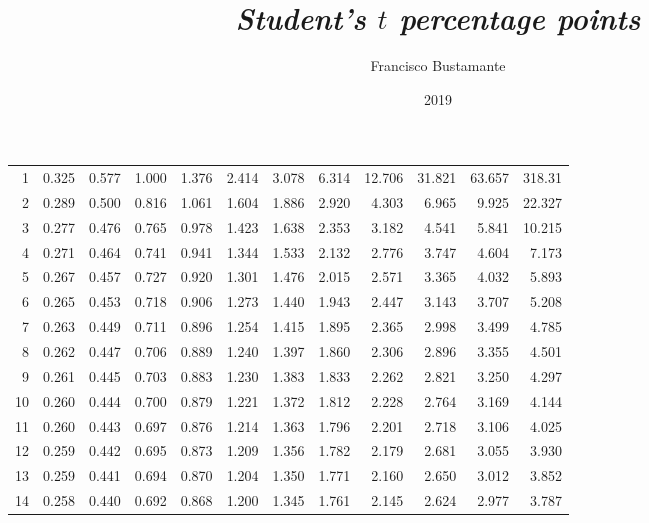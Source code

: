 \documentclass[a4paper, 10pt]{article}
\author{Francisco Bustamante}
\title{\textit{Student's $t$ percentage points}}
\date{2019}
\begin{document}
\small


\begin{center}
    \begin{supertabular}{rrrrrrrrrrrr}
        1        & 0.325 & 0.577 & 1.000 & 1.376 & 2.414 & 3.078 & 6.314 & 12.706 & 31.821 & 63.657 & 318.31 \\
        2        & 0.289 & 0.500 & 0.816 & 1.061 & 1.604 & 1.886 & 2.920 & 4.303  & 6.965  & 9.925  & 22.327 \\
        3        & 0.277 & 0.476 & 0.765 & 0.978 & 1.423 & 1.638 & 2.353 & 3.182  & 4.541  & 5.841  & 10.215 \\
        4        & 0.271 & 0.464 & 0.741 & 0.941 & 1.344 & 1.533 & 2.132 & 2.776  & 3.747  & 4.604  & 7.173 \\
        5        & 0.267 & 0.457 & 0.727 & 0.920 & 1.301 & 1.476 & 2.015 & 2.571  & 3.365  & 4.032  & 5.893 \\
        6        & 0.265 & 0.453 & 0.718 & 0.906 & 1.273 & 1.440 & 1.943 & 2.447  & 3.143  & 3.707  & 5.208 \\
        7        & 0.263 & 0.449 & 0.711 & 0.896 & 1.254 & 1.415 & 1.895 & 2.365  & 2.998  & 3.499  & 4.785 \\
        8        & 0.262 & 0.447 & 0.706 & 0.889 & 1.240 & 1.397 & 1.860 & 2.306  & 2.896  & 3.355  & 4.501 \\
        9        & 0.261 & 0.445 & 0.703 & 0.883 & 1.230 & 1.383 & 1.833 & 2.262  & 2.821  & 3.250  & 4.297 \\
        10       & 0.260 & 0.444 & 0.700 & 0.879 & 1.221 & 1.372 & 1.812 & 2.228  & 2.764  & 3.169  & 4.144 \\
        11       & 0.260 & 0.443 & 0.697 & 0.876 & 1.214 & 1.363 & 1.796 & 2.201  & 2.718  & 3.106  & 4.025 \\
        12       & 0.259 & 0.442 & 0.695 & 0.873 & 1.209 & 1.356 & 1.782 & 2.179  & 2.681  & 3.055  & 3.930 \\
        13       & 0.259 & 0.441 & 0.694 & 0.870 & 1.204 & 1.350 & 1.771 & 2.160  & 2.650  & 3.012  & 3.852 \\
        14       & 0.258 & 0.440 & 0.692 & 0.868 & 1.200 & 1.345 & 1.761 & 2.145  & 2.624  & 2.977  & 3.787 \\

\end{supertabular}
\end{center}
\end{document}
